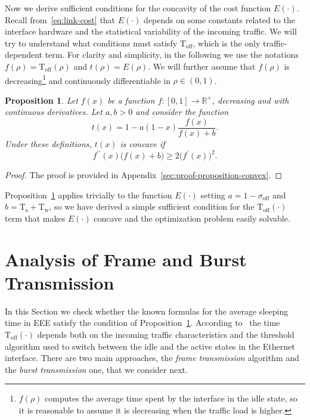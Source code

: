 \documentclass[journal,english,twocolumn,10pt,letterpaper]{IEEEtran}
\newcommand{\added}[1]{{#1}}
\newtheorem{proposition}[theorem]{Proposition}
\newcommand{\Constantconstant}[2]{\mathrm{#1}_{\mathrm{#2}}}
\newcommand{\Ts}{\Constantconstant T s}
\newcommand{\Tw}{\Constantconstant T w}
\newcommand{\Toff}{\mathrm{T}_{\mathrm{off}}}
\begin{document}
Now we derive sufficient conditions for the concavity of the cost function
$E(\cdot)$. Recall from~\eqref{eq:link-cost} that $E(\cdot)$ depends on some
constants related to the interface hardware and the statistical variability of
the incoming traffic. We will try to understand what conditions \added{must
  satisfy $\Toff$}, which is the only traffic-dependent term. For clarity and
simplicity, in the following we use the notations $f(\rho) = \Toff(\rho)$ and
$t(\rho) = E(\rho)$. We will further assume that $f(\rho)$ is
decreasing\footnote{$f(\rho)$ computes the average time spent by the interface
  in the idle state, so it is reasonable to assume it is decreasing when the
  traffic load is higher.} and continuously differentiable in
$\rho \in (0, 1)$.
\begin{proposition}
  \label{prop:convex}
  Let $f(x)$ be a function $f: [0, 1] \to \mathbb{R}^{+}$, decreasing and with
  continuous derivatives. Let $a, b > 0$ and consider the function
  \begin{equation}
    t(x) = 1 - a(1- x) \frac{f(x)}{f(x) + b}.
  \end{equation}
  Under these definitions, $t(x)$ is concave if
  \begin{equation}
    \label{eq:convex-condition}
    f^{\prime\prime}(x) \bigl( f(x) + b \bigr) \geq 2 \bigl( f^\prime(x) \bigr)^2.
  \end{equation}
\end{proposition}
\begin{proof}
  The proof is provided in \added{Appendix}~\ref{sec:proof-proposition-convex}.
\end{proof}

Proposition~\ref{prop:convex} applies trivially to the function $E(\cdot)$
setting $a = 1 - \sigma_{\text{off}}$ and $b = \Ts + \Tw$, \added{so} we have
derived a simple sufficient condition for the $\Toff(\cdot)$ term that makes
$E(\cdot)$ concave and the optimization problem easily solvable.

\section{Analysis of Frame and Burst Transmission}
\label{sec:toff}

In this Section we check whether the known formulas for the average sleeping
time in EEE satisfy the condition of Proposition~\ref{prop:convex}. According
to~\cite{herreria12:_gi_g_model_gb_energ_effic_ether} the time $\Toff(\cdot)$
depends both on the incoming traffic characteristics and the threshold
algorithm used to switch between the idle and the active states in the
Ethernet interface. There are two main approaches, the \emph{frame
  transmission} algorithm and the \emph{burst transmission} one, that we
consider next.
\end{document}
